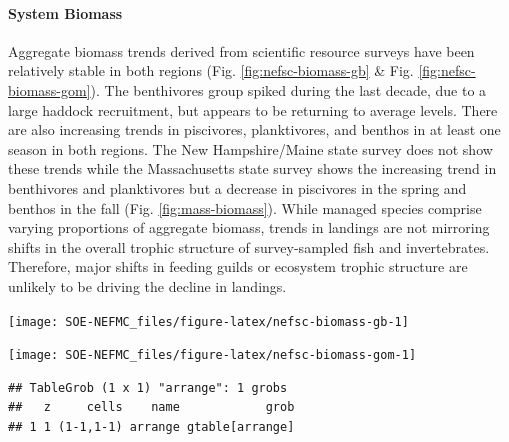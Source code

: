 \documentclass[
  10pt,
]{article}
\let\origfigure\figure
\let\endorigfigure\endfigure
\renewenvironment{figure}[1][2] {
    \expandafter\origfigure\expandafter[H]
} {
    \endorigfigure
}
\begin{document}
\hypertarget{system-biomass}{%
\paragraph{System Biomass}\label{system-biomass}}

Aggregate biomass trends derived from scientific resource surveys have been relatively stable in both regions (Fig. \ref{fig:nefsc-biomass-gb} \& Fig. \ref{fig:nefsc-biomass-gom}). The benthivores group spiked during the last decade, due to a large haddock recruitment, but appears to be returning to average levels. There are also increasing trends in piscivores, planktivores, and benthos in at least one season in both regions. The New Hampshire/Maine state survey does not show these trends while the Massachusetts state survey shows the increasing trend in benthivores and planktivores but a decrease in piscivores in the spring and benthos in the fall (Fig. \ref{fig:mass-biomass}). While managed species comprise varying proportions of aggregate biomass, trends in landings are not mirroring shifts in the overall trophic structure of survey-sampled fish and invertebrates. Therefore, major shifts in feeding guilds or ecosystem trophic structure are unlikely to be driving the decline in landings.

\begin{figure}

{\centering \texttt{[image: SOE-NEFMC\_files/figure-latex/nefsc-biomass-gb-1]} 

}

\caption{Spring (left) and fall (right) surveyed biomass on Georges Bank. The shaded area around each annual mean represents 2 standard deviations from the mean.}\label{fig:nefsc-biomass-gb}
\end{figure}

\begin{figure}

{\centering \texttt{[image: SOE-NEFMC\_files/figure-latex/nefsc-biomass-gom-1]} 

}

\caption{Spring (left) and fall (right) surveyed biomass in the Gulf of Maine. The shaded area around each annual mean represents 2 standard deviations from the mean.}\label{fig:nefsc-biomass-gom}
\end{figure}

\begin{verbatim}
## TableGrob (1 x 1) "arrange": 1 grobs
##   z     cells    name            grob
## 1 1 (1-1,1-1) arrange gtable[arrange]
\end{verbatim}
\end{document}
